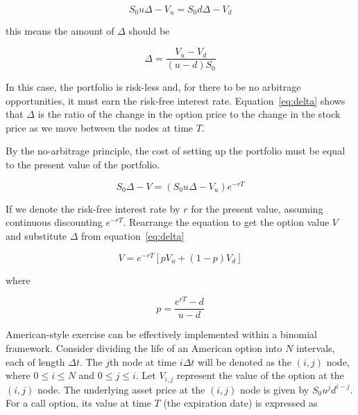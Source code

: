     \begin{equation}
        S_0 u \Delta- V_u = S_0 d \Delta - V_d
        \label{eq:risk_neutral}
    \end{equation}

    this means the amount of $\Delta$ should be

    \begin{equation}
        \Delta = \frac{V_u - V_d}{(u - d) S_0}
        \label{eq:delta}
    \end{equation}

    In this case, the portfolio is risk-less and, for there to be no arbitrage opportunities,
    it must earn the risk-free interest rate.
    Equation~\ref{eq:delta} shows that $\Delta$ is the ratio of the change in the option price to the change
    in the stock price as we move between the nodes at time $T$.

    By the no-arbitrage principle, the cost of setting up the portfolio must be equal to the present value of the portfolio.

    \begin{equation}
        S_0 \Delta - V = (S_0 u \Delta - V_u)e^{-rT}
        \label{eq:no_arbitrage}
    \end{equation}

    If we denote the risk-free interest rate by $r$ for the present value,
    assuming continuous discounting $e^{-rT}$.
    Rearrange the equation to get the option value $V$ and substitute $\Delta$ from equation~\ref{eq:delta}

    \begin{equation}
        V = e^{-rT} [p V_u + (1 - p) V_d]
        \label{eq:option_value}
    \end{equation}

    where

    \begin{equation}
        p = \frac{e^{rT} - d}{u - d}
        \label{eq:prob_value}
    \end{equation}

    American-style exercise can be effectively implemented within a binomial framework.
    Consider dividing the life of an American option into $N$ intervals, each of length $\Delta t$.
    The $j$th node at time $i \Delta t$ will be denoted as the $(i, j)$ node,
    where $0 \leq i \leq N$ and $0 \leq j \leq i$.
    Let $V_{i,j}$ represent the value of the option at the $(i, j)$ node.
    The underlying asset price at the $(i, j)$ node is given by $S_0 u^j d^{i-j}$.
    For a call option, its value at time $T$ (the expiration date) is expressed as

